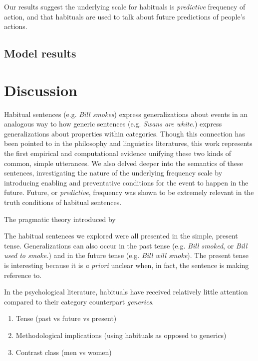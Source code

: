 \documentclass[10pt,letterpaper]{article}
\begin{document}
Our results suggest the underlying scale for habituals is \emph{predictive} frequency of action, and that habituals are used to talk about future predictions of people's actions.

\subsection{Model results}


\section{Discussion}


Habitual sentences (e.g. \emph{Bill smokes}) express generalizations about events in an analogous way to how generic sentences (e.g. \emph{Swans are white.}) express generalizations about properties within categories. 
Though this connection has been pointed to in the philosophy and linguistics literatures, this work represents the first empirical and computational evidence unifying these two kinds of common, simple utterances. 
We also delved deeper into the semantics of these sentences, investigating the nature of the underlying frequency scale by introducing enabling and preventative conditions for the event to happen in the future. 
Future, or \emph{predictive}, frequency was shown to be extremely relevant in the truth conditions of habitual sentences. 

The pragmatic theory introduced by  

The habitual sentences we explored were all presented in the simple, present tense.
Generalizations can also occur in the past tense (e.g. \emph{Bill smoked}, or \emph{Bill used to smoke.}) and in the future tense (e.g. \emph{Bill will smoke}). 
The present tense is interesting because it is \emph{a priori} unclear when, in fact, the sentence is making reference to.  

In the psychological literature, habituals have received relatively little attention compared to their category counterpart \emph{generics}. 

\begin{enumerate}
\item Tense (past vs future vs present)
\item Methodological implications (using habituals as opposed to generics)
\item Contrast class (men vs women)
\end{enumerate}
\end{document}
